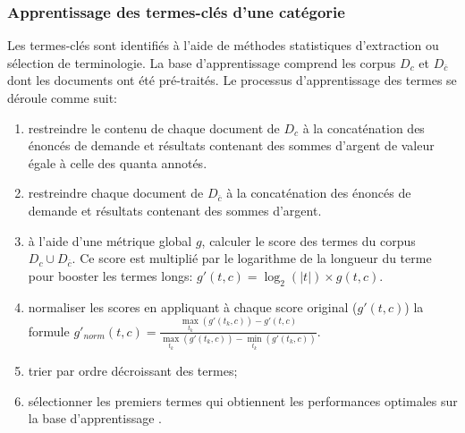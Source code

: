 \subsubsection{Apprentissage des termes-clés d'une catégorie}
Les termes-clés sont identifiés à l'aide de méthodes statistiques d'extraction ou sélection de terminologie. La base d'apprentissage comprend les corpus $D_c$ et $D_{\overline{c}}$ dont les documents ont été pré-traités. %
 Le processus d'apprentissage des termes se déroule comme suit:
 
 \begin{enumerate}
 	\item restreindre le contenu de chaque document de $D_c$ à la concaténation des énoncés de demande et résultats contenant des sommes d'argent de valeur égale à celle des quanta annotés.
 	\item restreindre chaque document de  $D_{\overline{c}}$ à la concaténation des énoncés  de demande et résultats contenant des sommes d'argent.
 	\item à l'aide d'une métrique global $g$, calculer le score des termes du corpus $D_c \cup D_{\overline{c}}$. Ce score est multiplié par le logarithme de la longueur du terme pour booster les termes longs: $g'(t,c) = \log_2(\vert t \vert) \times g(t, c)$.
 	\item normaliser les scores en appliquant à chaque score original ($g'(t,c)$) la formule $g'_{norm}(t,c) = \frac{\max\limits_{t_k} (g'(t_k,c)) - g'(t,c)}{\max\limits_{t_k} (g'(t_k,c)) - \min\limits_{t_k} (g'(t_k,c))}$. 
 	\item trier par ordre décroissant des termes;
 	\item sélectionner les premiers termes qui obtiennent les performances optimales sur la base d'apprentissage .
 \end{enumerate}



